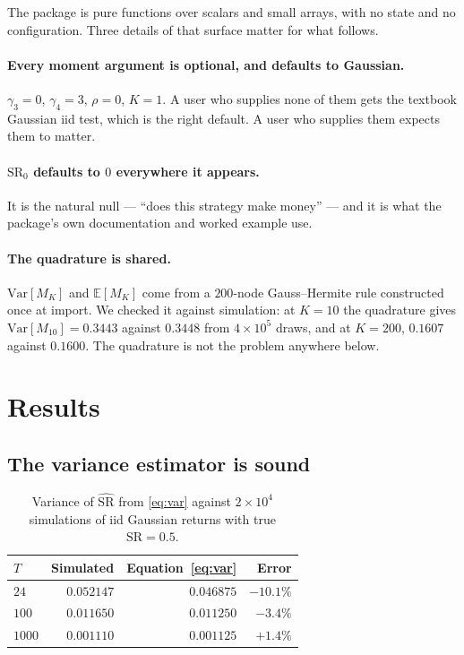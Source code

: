 \documentclass[11pt,a4paper]{article}
\newcommand{\SR}{\mathrm{SR}}
\begin{document}
The package is pure functions over scalars and small arrays, with no state and
no configuration. Three details of that surface matter for what follows.

\paragraph{Every moment argument is optional, and defaults to Gaussian.}
$\gamma_3 = 0$, $\gamma_4 = 3$, $\rho = 0$, $K = 1$. A user who supplies none
of them gets the textbook Gaussian iid test, which is the right default. A user
who supplies them expects them to matter.

\paragraph{$\SR_0$ defaults to $0$ everywhere it appears.} It is the natural
null --- ``does this strategy make money'' --- and it is what the package's own
documentation and worked example use.

\paragraph{The quadrature is shared.}
$\mathrm{Var}[M_K]$ and $\mathbb{E}[M_K]$ come from a $200$-node
Gauss--Hermite rule constructed once at import. We checked it against
simulation: at $K = 10$ the quadrature gives
$\mathrm{Var}[M_{10}] = 0.3443$ against $0.3448$ from $4 \times 10^5$ draws,
and at $K = 200$, $0.1607$ against $0.1600$. The quadrature is not the
problem anywhere below.

\section{Results}
\label{sec:results}

\subsection{The variance estimator is sound}

\begin{table}[t]
\centering
\caption{Variance of $\widehat{\SR}$ from \eqref{eq:var} against $2 \times
10^4$ simulations of iid Gaussian returns with true $\SR = 0.5$.}
\label{tab:var}
\begin{tabular}{lrrr}
\toprule
$T$ & Simulated & Equation~\eqref{eq:var} & Error \\
\midrule
$24$   & $0.052147$ & $0.046875$ & $-10.1\%$ \\
$100$  & $0.011650$ & $0.011250$ & $-3.4\%$ \\
$1000$ & $0.001110$ & $0.001125$ & $+1.4\%$ \\
\bottomrule
\end{tabular}
\end{table}
\end{document}
